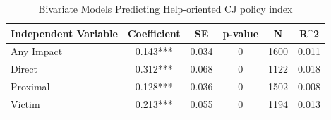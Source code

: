 \begin{table}

\caption{\label{tab:tab:prisonhelp_bivariate}Bivariate Models Predicting Help-oriented CJ policy index}
\centering
\begin{tabular}[t]{lccccc}
\toprule
Independent Variable & Coefficient & SE & p-value & N & R\textasciicircum{}2\\
\midrule
Any Impact & 0.143*** & 0.034 & 0 & 1600 & 0.011\\
Direct & 0.312*** & 0.068 & 0 & 1122 & 0.018\\
Proximal & 0.128*** & 0.036 & 0 & 1502 & 0.008\\
Victim & 0.213*** & 0.055 & 0 & 1194 & 0.013\\
\bottomrule
\end{tabular}
\end{table}
